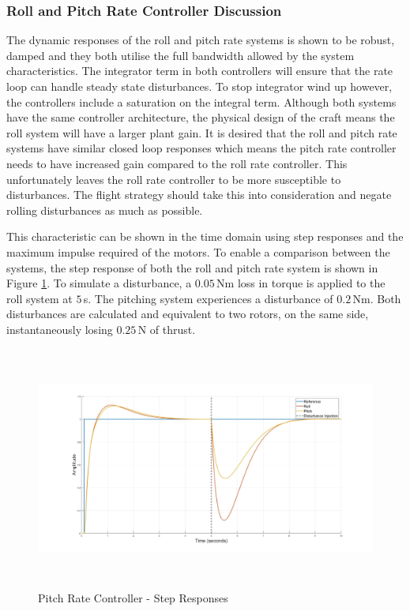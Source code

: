 		
		\subsubsection{Roll and Pitch Rate Controller Discussion}
		The dynamic responses of the roll and pitch rate systems is shown to be robust, damped and they both utilise the full bandwidth allowed by the system characteristics. The integrator term in both controllers will ensure that the rate loop can handle steady state disturbances. To stop integrator wind up however, the controllers include a saturation on the integral term. Although both systems have the same controller architecture, the physical design of the craft means the roll system will have a larger plant gain. It is desired that the roll and pitch rate systems have similar closed loop responses which means the pitch rate controller needs to have increased gain compared to the roll rate controller. This unfortunately leaves the roll rate controller to be more susceptible to disturbances. The flight strategy should take this into consideration and negate rolling disturbances as much as possible.
		
		This characteristic can be shown in the time domain using step responses and the maximum impulse required of the motors. To enable a comparison between the systems, the step response of both the roll and pitch rate system is shown in Figure \ref{IM_PitchRateStep}. To simulate a disturbance, a $0.05$\,Nm loss in torque is applied to the roll system at $5$\,s. The pitching system experiences a disturbance of $0.2$\,Nm. Both disturbances are calculated and equivalent to two rotors, on the same side, instantaneously losing $0.25$\,N of thrust.
		
		\begin{figure}[H]
			\centering
			\includegraphics[height = 8cm]{../Design/Matlab/Controllers/roll_pitch_rate_step.jpg}
			\caption{Pitch Rate Controller -  Step Responses}
			\label{IM_PitchRateStep}
		\end{figure}
		
